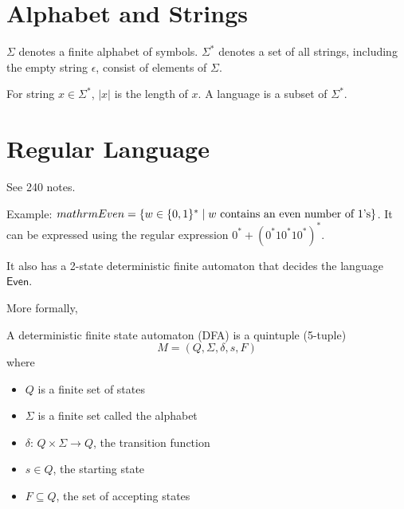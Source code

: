 \section{Alphabet and Strings}

$\Sigma$ denotes a finite alphabet of symbols. $\Sigma^*$ denotes a set of all strings, including the empty string $\epsilon$, consist of elements of $\Sigma$.

For string $x \in \Sigma^*$, $|x|$ is the length of $x$. A language is a subset of $\Sigma^*$.

\section{Regular Language}

See 240 notes.

Example: $\\mathrm{Even} = \{ w \in \{0,1\}^* \mid \text{$w$ contains an even number of 1's}\}$. It can be expressed using the regular expression $0^* + (0^*10^*10^*)^*$.

It also has a 2-state deterministic finite automaton that decides the language $\mathsf{Even}$.
\begin{center}
\end{center}

More formally,
\begin{definition}
    A deterministic finite state automaton (DFA) is a quintuple (5-tuple)
    $$
    M = (Q,\Sigma,\delta,s,F)
    $$
    where
    \begin{itemize}
        \item $Q$ is a finite set of states
        \item $\Sigma$ is a finite set called the alphabet
        \item $\delta:\, Q\times\Sigma \to Q$, the transition function
        \item $s \in Q$, the starting state
        \item $F \subseteq Q$, the set of accepting states
    \end{itemize}
\end{definition}